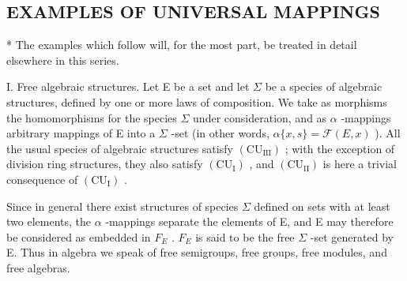 \subsection{EXAMPLES OF UNIVERSAL MAPPINGS}

* The examples which follow will, for the most part, be treated in detail elsewhere in this series.

I. Free algebraic structures. Let E be a set and let \(\Sigma\) be a species of algebraic structures, defined by one or more laws of composition. We take as morphisms the homomorphisms for the species \(\Sigma\) under consideration, and as \(\alpha\) -mappings arbitrary mappings of E into a \(\Sigma\) -set (in other words, \(\alpha\{x, s\} = \mathcal{F}(E, x)\) ). All the usual species of algebraic structures satisfy \((\mathrm{CU}_{\mathrm{III}})\) ; with the exception of division ring structures, they also satisfy \((\mathrm{CU}_{\mathrm{I}})\) , and \((\mathrm{CU}_{\mathrm{II}})\) is here a trivial consequence of \((\mathrm{CU}_{\mathrm{I}})\) .

Since in general there exist structures of species \(\Sigma\) defined on sets with at least two elements, the \(\alpha\) -mappings separate the elements of E, and E may therefore be considered as embedded in \(F_{E}\) . \(F_{E}\) is said to be the free \(\Sigma\) -set generated by E. Thus in algebra we speak of free semigroups, free groups, free modules, and free algebras.

